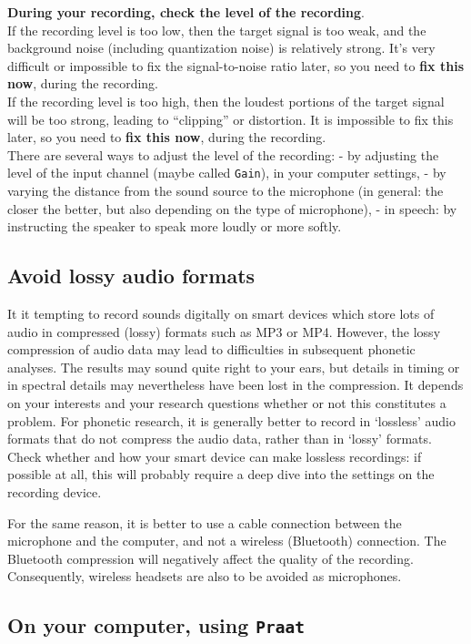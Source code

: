 \documentclass[
]{book}
\begin{document}
\textbf{During your recording, check the level of the recording}.\\
If the recording level is too low, then the target signal is too weak, and the background noise (including quantization noise) is relatively strong. It's very difficult or impossible to fix the signal-to-noise ratio later, so you need to \textbf{fix this now}, during the recording.\\
If the recording level is too high, then the loudest portions of the target signal will be too strong, leading to ``clipping'' or distortion. It is impossible to fix this later, so you need to \textbf{fix this now}, during the recording.\\
There are several ways to adjust the level of the recording:
- by adjusting the level of the input channel (maybe called \texttt{Gain}), in your computer settings,
- by varying the distance from the sound source to the microphone (in general: the closer the better, but also depending on the type of microphone),
- in speech: by instructing the speaker to speak more loudly or more softly.

\subsection{Avoid lossy audio formats}\label{sec:avoidlossyformats}

It it tempting to record sounds digitally on smart devices which store lots of audio in compressed (lossy) formats such as MP3 or MP4. However, the lossy compression of audio data may lead to difficulties in subsequent phonetic analyses. The results may sound quite right to your ears, but details in timing or in spectral details may nevertheless have been lost in the compression. It depends on your interests and your research questions whether or not this constitutes a problem.
For phonetic research, it is generally better to record in `lossless' audio formats that do not compress the audio data, rather than in `lossy' formats. Check whether and how your smart device can make lossless recordings: if possible at all, this will probably require a deep dive into the settings on the recording device.

For the same reason, it is better to use a cable connection between the microphone and the computer, and not a wireless (Bluetooth) connection. The Bluetooth compression will negatively affect the quality of the recording. Consequently, wireless headsets are also to be avoided as microphones.

\subsection{\texorpdfstring{On your computer, using \texttt{Praat}}{On your computer, using Praat}}\label{on-your-computer-using-praat}
\end{document}
